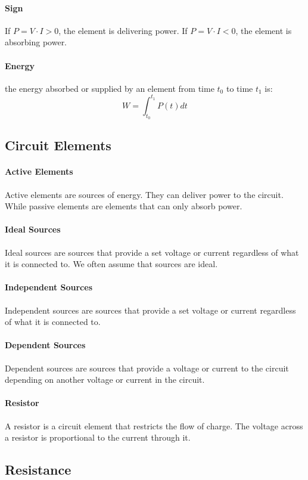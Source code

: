 \documentclass[11pt]{article}
\begin{document}
\paragraph{Sign} If $P = V \cdot I > 0$, the element is delivering power. If $P = V \cdot I < 0$, the element is absorbing power.
\paragraph{Energy}  the energy absorbed or supplied by an element
from time $t_0$ to time $t_1$ is:
\begin{equation}
    W = \int_{t_0}^{t_1} P(t) dt
\end{equation}
\subsection{Circuit Elements}
\paragraph{Active Elements} Active elements are sources of energy. They can deliver power to the circuit. While passive elements are elements that can only absorb power.
\paragraph{Ideal Sources} Ideal sources are sources that provide a set voltage or current regardless of what it is connected to. We often assume that sources are ideal.
\paragraph{Independent Sources} Independent sources are sources that provide a set voltage or current regardless of what it is connected to.
\paragraph{Dependent Sources} Dependent sources are sources that provide a voltage or current to the circuit depending on another voltage or current in the circuit.
\paragraph{Resistor} A resistor is a circuit element that restricts the flow of charge. The voltage across a resistor is proportional to the current through it.

\subsection{Resistance}
\end{document}
